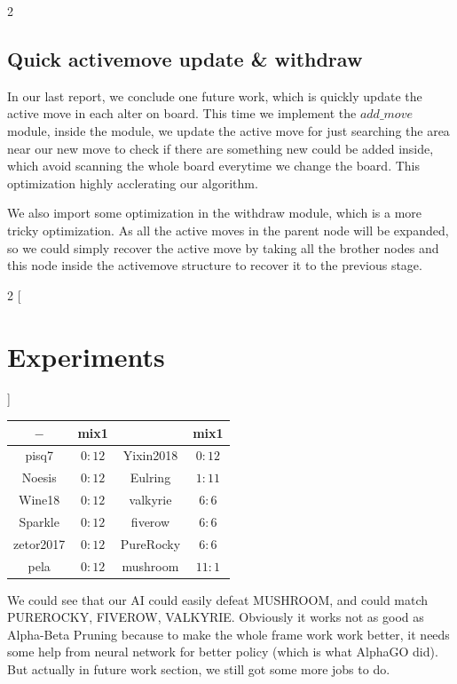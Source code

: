 \documentclass[a4paper, 11pt]{article} %
\begin{document}
\begin{multicols}{2}
		\subsection{Quick activemove update \& withdraw}
		
		In our last report, we conclude one future work, which is quickly update the active move in each alter on board. This time we implement the $add\_move$ module, inside the module, we update the active move for just searching the area near our new move to check if there are something new could be added inside, which avoid scanning the whole board everytime we change the board. This optimization highly acclerating our algorithm.
		
		We also import some optimization in the withdraw module, which is a more tricky optimization. As all the active moves in the parent node will be expanded, so we could simply recover the active move by taking all the brother nodes and this node inside the activemove structure to recover it to the previous stage.
		
	\end{multicols}
	\begin{multicols}{2}
		[
		\section{Experiments}
		]
		
		\begin{tabular}{|c|c|c|c|}
			\hline$-$ & mix1 & & mix1\\
			\hline \hline pisq7 & $0: 12$ & Yixin2018 & $0: 12$ \\
			\hline \hline Noesis & $0: 12$ & Eulring & $1: 11$ \\
			\hline \hline Wine18 & $0: 12$ & valkyrie & $6: 6$\\
			\hline \hline Sparkle & $0: 12$ & fiverow & $6: 6$ \\
			\hline \hline zetor2017 & $0: 12$ & PureRocky & $6: 6$ \\
			\hline \hline pela & $0: 12$ & mushroom & $11: 1$ \\
			\hline
		\end{tabular}
	
	 	We could see that our AI could easily defeat MUSHROOM, and could match PUREROCKY, FIVEROW, VALKYRIE. Obviously it works not as good as Alpha-Beta Pruning because to make the whole frame work work better, it needs some help from neural network for better policy (which is what AlphaGO did). But actually in future work section, we still got some more jobs to do.
	 	
	\end{multicols}
\end{document}
